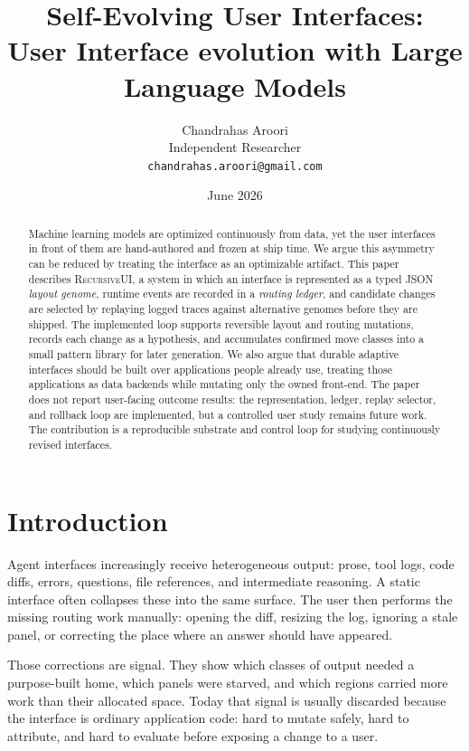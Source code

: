 \documentclass[11pt]{article}
\title{\textbf{Self-Evolving User Interfaces:\\
User Interface evolution with Large Language Models}}
\author{Chandrahas Aroori\\
\small Independent Researcher\\
\small \texttt{chandrahas.aroori@gmail.com}}
\date{June 2026}
\begin{document}
\maketitle

\begin{abstract}
\noindent
Machine learning models are optimized continuously from data, yet the user
interfaces in front of them are hand-authored and frozen at ship time. We argue
this asymmetry can be reduced by treating the interface as an optimizable
artifact. This paper describes \textsc{RecursiveUI}, a system in which an
interface is represented as a typed JSON \emph{layout genome}, runtime events are
recorded in a \emph{routing ledger}, and candidate changes are selected by
replaying logged traces against alternative genomes before they are shipped. The
implemented loop supports reversible layout and routing mutations, records each
change as a hypothesis, and accumulates confirmed move classes into a small
pattern library for later generation. We also argue that durable adaptive
interfaces should be built over applications people already use, treating those
applications as data backends while mutating only the owned front-end. The paper
does not report user-facing outcome results: the representation, ledger, replay
selector, and rollback loop are implemented, but a controlled user study remains
future work. The contribution is a reproducible substrate and control loop for
studying continuously revised interfaces.
\end{abstract}

\section{Introduction}

Agent interfaces increasingly receive heterogeneous output: prose, tool logs,
code diffs, errors, questions, file references, and intermediate reasoning. A
static interface often collapses these into the same surface. The user then
performs the missing routing work manually: opening the diff, resizing the log,
ignoring a stale panel, or correcting the place where an answer should have
appeared.

Those corrections are signal. They show which classes of output needed a
purpose-built home, which panels were starved, and which regions carried more
work than their allocated space. Today that signal is usually discarded because
the interface is ordinary application code: hard to mutate safely, hard to
attribute, and hard to evaluate before exposing a change to a user.
\end{document}
